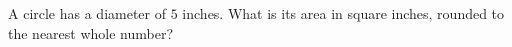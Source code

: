 A circle has a diameter of $5$ inches. What is its area in square inches, rounded to the nearest whole number?
